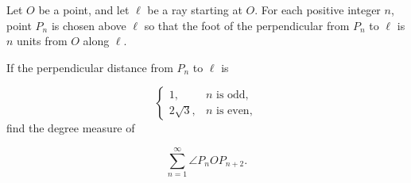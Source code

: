Let $O$ be a point, and let $\ell$ be a ray starting at $O$. For each positive integer $n$, point $P_n$ is chosen above $\ell$ so that the foot of the perpendicular from $P_n$ to $\ell$ is $n$ units from $O$ along $\ell$.

If the perpendicular distance from $P_n$ to $\ell$ is

\[
\begin{cases}
1, & n\text{ is odd},\\
2\sqrt3, & n\text{ is even},
\end{cases}
\]find the degree measure of

\[
\sum_{n=1}^{\infty}\angle P_nOP_{n+2}.
\]
